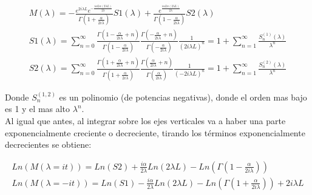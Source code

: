 \begin{equation}
\begin{array}{c}
M( \lambda ) = 
-
 \frac{e ^{2 i \lambda L } e ^{ - \frac{i \alpha Ln \left( 2 \lambda L \right) }{2 \lambda } }  }
      { \Gamma \left( 1 + \frac{ \alpha}{2 i \lambda}  \right) } S1 ( \lambda ) +
 \frac{ e ^{   \frac{i \alpha Ln \left(2 \lambda L \right) } 
           {2 \lambda } } }
      { \Gamma \left( 1 - \frac{ \alpha}{2 i \lambda}  \right)   } S2 ( \lambda )  \\ [15pt]
      
S1 ( \lambda ) = \sum _{n=0} ^{ \infty }
\frac{\Gamma (1 - \frac{ \alpha}{2 i \lambda} + n )}{\Gamma (1 - \frac{ \alpha}{2 i \lambda})} 
\frac{\Gamma (- \frac{ \alpha}{2 i \lambda} + n )}{\Gamma (- \frac{\alpha}{2 i \lambda})} 
\frac{1}{( 2 i \lambda L ) ^n} = 
1 + \sum _{n=1} ^{\infty} \frac{S ^{(1)} _n (\lambda)}{\lambda ^n} \\ [10pt]

S2 (\lambda ) = \sum _{n=0 } ^{\infty}
\frac{ \Gamma ( 1 + \frac{ \alpha}{2 i \lambda } + n ) }{\Gamma ( 1 + \frac{ \alpha}{2 i \lambda } )}
\frac{\Gamma ( \frac{ \alpha }{2 i \lambda} + n )}{\Gamma ( \frac{ \alpha }{2 i \lambda} )}
\frac{1}{( - 2 i \lambda L ) ^n} = 
1 + \sum _{n=1} ^{\infty} \frac{S ^{(2)} _n (\lambda)}{\lambda ^n}
\end{array}
\label{larga}
\end{equation}

Donde $S _n ^{(1,2)}$ es un polinomio (de potencias negativas), donde el orden mas bajo es 1 y el mas alto $\lambda ^n$. \\


Al igual que antes, al integrar sobre los ejes verticales va a haber una parte exponencialmente creciente o decreciente, tirando los términos exponencialmente decrecientes se obtiene:

\begin{equation}
\begin{array}{c}

Ln ( M ( \lambda = i t ) ) =  Ln(S2) + 
\frac{i \alpha }{2 \lambda} Ln(2 \lambda L) - 
Ln( \Gamma( 1 - \frac{ \alpha}{2 i \lambda} ) ) \\ 

Ln( M ( \lambda = -i t ) ) = Ln(S1) -  
\frac{i \alpha }{2 \lambda} Ln( 2 \lambda L ) - 
Ln( \Gamma ( 1 + \frac{ \alpha}{2 i \lambda} )) +
2 i \lambda L 

\end{array}
\end{equation}

